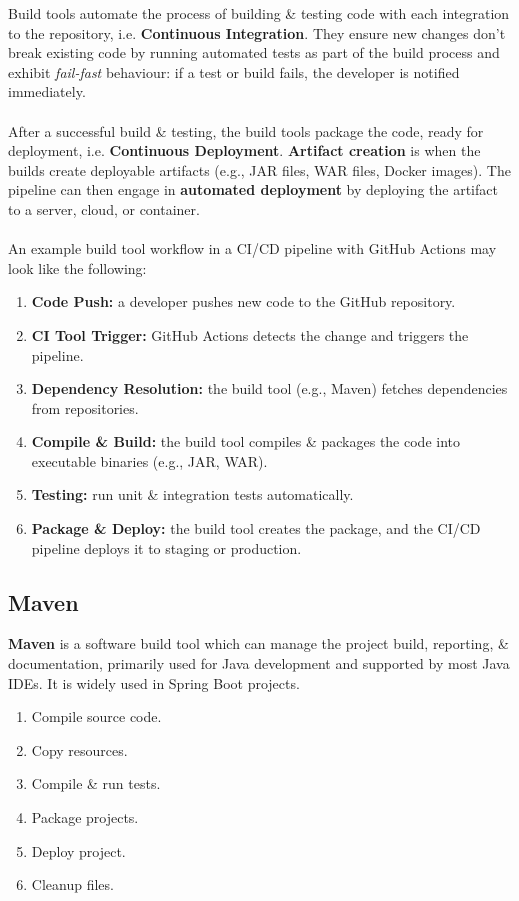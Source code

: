 \documentclass[a4paper,11pt]{article}
\begin{document}
Build tools automate the process of building \& testing code with each integration to the repository, i.e.
\textbf{Continuous Integration}.
They ensure new changes don't break existing code by running automated tests as part of the build process and exhibit 
\textit{fail-fast} behaviour: if a test or build fails, the developer is notified immediately.
\\\\
After a successful build \& testing, the build tools package the code, ready for deployment, i.e. 
\textbf{Continuous Deployment}.
\textbf{Artifact creation} is when the builds create deployable artifacts (e.g., JAR files, WAR files, Docker images).
The pipeline can then engage in \textbf{automated deployment} by deploying the artifact to a server, cloud, or container.
\\\\
An example build tool workflow in a CI/CD pipeline with GitHub Actions may look like the following:
\begin{enumerate}
    \item   \textbf{Code Push:} a developer pushes new code to the GitHub repository.
    \item   \textbf{CI Tool Trigger:} GitHub Actions detects the change and triggers the pipeline.
    \item   \textbf{Dependency Resolution:} the build tool (e.g., Maven) fetches dependencies from repositories.
    \item   \textbf{Compile \& Build:} the build tool compiles \& packages the code into executable binaries (e.g., JAR, WAR).
    \item   \textbf{Testing:} run unit \& integration tests automatically.
    \item   \textbf{Package \& Deploy:} the build tool creates the package, and the CI/CD pipeline deploys it to staging or 
            production.
\end{enumerate}

\subsection{Maven}
\textbf{Maven} is a software build tool which can manage the project build, reporting, \& documentation, primarily used for
Java development and supported by most Java IDEs.
It is widely used in Spring Boot projects.
\begin{enumerate}
    \item   Compile source code.
    \item   Copy resources.
    \item   Compile \& run tests.
    \item   Package projects.
    \item   Deploy project.
    \item   Cleanup files.
\end{enumerate}
\end{document}

